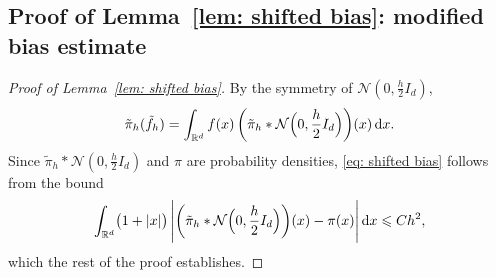 \subsection{Proof of Lemma~\ref{lem: shifted bias}: modified bias estimate}
\label{sec: shifted bias proof}

\begin{proof}[Proof of Lemma~\ref{lem: shifted bias}]
    By the symmetry of $\mathcal N(0, \frac h2 I_d)$,
    \begin{equation*}
        \tilde\pi_h(\tilde f_h) = \int_{\mathbb R^d} f(x)\, \biggl( \tilde\pi_h * \mathcal N\Bigl( 0, \frac h2 I_d \Bigr) \biggr)(x) \,\mathrm{d} x .
    \end{equation*}
    Since $\tilde\pi_h * \mathcal N(0, \frac h2 I_d)$ and $\pi$ are probability densities, \eqref{eq: shifted bias} follows from the bound
    \begin{equation}
        \int_{\mathbb R^d} \bigl( 1 + |x| \bigr)\, \Biggl| \biggl( \tilde\pi_h * \mathcal N\Bigl( 0, \frac h2 I_d \Bigr) \biggr)(x) - \pi(x) \Biggr| \,\mathrm{d} x \leqslant C h^2 ,
        \label{eq: density comparison}
    \end{equation}
    which the rest of the proof establishes.


\end{proof}
